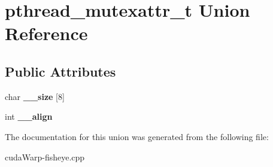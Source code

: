 \hypertarget{unionpthread__mutexattr__t}{}\section{pthread\+\_\+mutexattr\+\_\+t Union Reference}
\label{unionpthread__mutexattr__t}
\subsection*{Public Attributes}
\begin{DoxyCompactItemize}
\item 
char {\bfseries \+\_\+\+\_\+size} \mbox{[}8\mbox{]}\hypertarget{unionpthread__mutexattr__t_a415ef4672e01e6f9e26513c1c88a3164}{}\label{unionpthread__mutexattr__t_a415ef4672e01e6f9e26513c1c88a3164}

\item 
int {\bfseries \+\_\+\+\_\+align}\hypertarget{unionpthread__mutexattr__t_acd638babf3a7cd2d4d576938de9fe8e8}{}\label{unionpthread__mutexattr__t_acd638babf3a7cd2d4d576938de9fe8e8}

\end{DoxyCompactItemize}


The documentation for this union was generated from the following file\+:\begin{DoxyCompactItemize}
\item 
cuda\+Warp-\/fisheye.\+cpp\end{DoxyCompactItemize}
